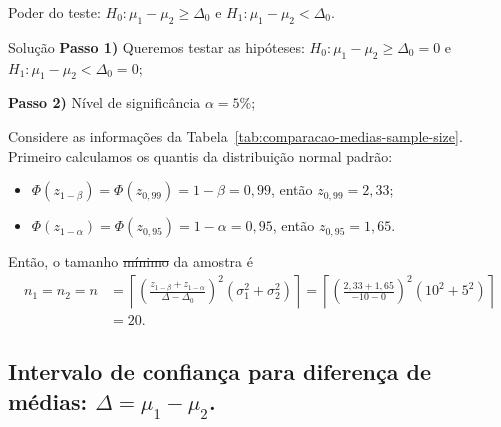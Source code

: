 \documentclass[9pt]{beamer}
\begin{document}
\begin{frame}{Poder do teste: $H_0:\mu_1 - \mu_2 \geq \Delta_0$ e $H_1: \mu_1 - \mu_2 < \Delta_0$.}

\begin{block}{Solução}
	\textbf{Passo 1)} Queremos testar as hipóteses: $H_0: \mu_1 - \mu_2 \geq \Delta_0 = 0$  e $H_1: \mu_1 - \mu_2 < \Delta_0=0$;
	
	\textbf{Passo 2)} Nível de significância $\alpha=5\%$;
	
	Considere as informações da Tabela~\ref{tab:comparacao-medias-sample-size}. Primeiro calculamos os quantis da distribuição normal padrão:
	\begin{itemize}
		\item $\Phi\left(z_{1-\beta}\right) = \Phi\left(z_{0,99}\right) = 1-\beta = 0,99$, então $z_{0,99} = 2,33$;
		\item $\Phi\left(z_{1-\alpha}\right) = \Phi\left(z_{0,95}\right) = 1-\alpha = 0,95$, então $z_{0,95} = 1,65$.
	\end{itemize}

	Então, o tamanho \sout{mínimo} da amostra é 
	\begin{align*}
	n_1=n_2=n&=\left\lceil \left( \frac{z_{1-\beta} + z_{1-\alpha}}{\Delta - \Delta_0} \right)^2 (\sigma_1^2 + \sigma_2^2) \right\rceil=\left\lceil \left( \frac{2,33 + 1,65}{-10 - 0} \right)^2 (10^2 + 5^2) \right\rceil\\
	&=  20.	
	\end{align*}
\end{block}

\end{frame}

\subsection{Intervalo de confiança para diferença de médias: $\Delta = \mu_1 - \mu_2$.}
\end{document}

